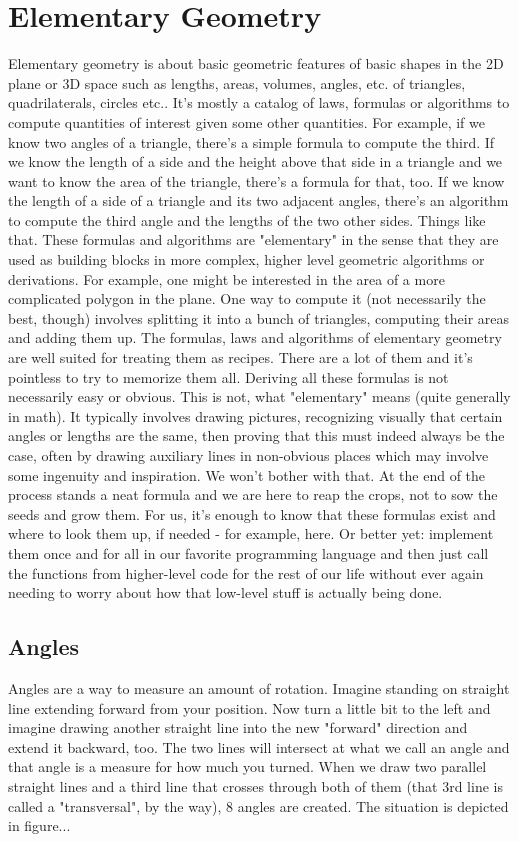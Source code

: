 \section{Elementary Geometry}
Elementary geometry is about basic geometric features of basic shapes in the 2D plane or 3D space such as lengths, areas, volumes, angles, etc. of triangles, quadrilaterals, circles etc.. It's mostly a catalog of laws, formulas or algorithms to compute quantities of interest given some other quantities. For example, if we know two angles of a triangle, there's a simple formula to compute the third. If we know the length of a side and the height above that side in a triangle and we want to know the area of the triangle, there's a formula for that, too. If we know the length of a side of a triangle and its two adjacent angles, there's an algorithm to compute the third angle and the lengths of the two other sides. Things like that. These formulas and algorithms are "elementary" in the sense that they are used as building blocks in more complex, higher level geometric algorithms or derivations. For example, one might be interested in the area of a more complicated polygon in the plane. One way to compute it (not necessarily the best, though) involves splitting it into a bunch of triangles, computing their areas and adding them up. The formulas, laws and algorithms of elementary geometry are well suited for treating them as recipes. There are a lot of them and it's pointless to try to memorize them all. Deriving all these formulas is not necessarily easy or obvious. This is not, what "elementary" means (quite generally in math). It typically involves drawing pictures, recognizing visually that certain angles or lengths are the same, then proving that this must indeed always be the case, often by drawing auxiliary lines in non-obvious places which may involve some ingenuity and inspiration. We won't bother with that. At the end of the process stands a neat formula and we are here to reap the crops, not to sow the seeds and grow them. For us, it's enough to know that these formulas exist and where to look them up, if needed - for example, here. Or better yet: implement them once and for all in our favorite programming language and then just call the functions from higher-level code for the rest of our life without ever again needing to worry about how that low-level stuff is actually being done. 



\subsection{Angles}
Angles are a way to measure an amount of rotation. Imagine standing on straight line extending forward from your position. Now turn a little bit to the left and imagine drawing another straight line into the new "forward" direction and extend it backward, too. The two lines will intersect at what we call an angle and that angle is a measure for how much you turned. When we draw two parallel straight lines and a third line that crosses through both of them (that 3rd line is called a "transversal", by the way), 8 angles are created. The situation is depicted in figure...

